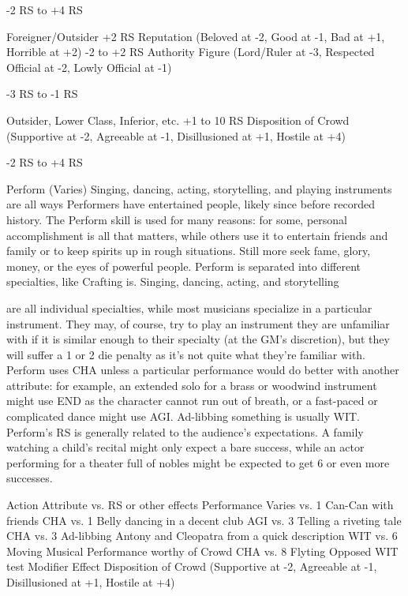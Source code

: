 \documentclass[oneside,11pt,english]{book}
\begin{document}
-2 RS to +4 RS 

Foreigner/Outsider +2 RS 
Reputation (Beloved at -2, Good at -1, Bad at +1, Horrible at +2) -2 to +2 RS 
Authority Figure (Lord/Ruler at -3, Respected Official at -2, Lowly 
Official at -1) 

-3 RS to -1 RS 

Outsider, Lower Class, Inferior, etc. +1 to 10 RS 
Disposition of Crowd (Supportive at -2, Agreeable at -1, Disillusioned at 
+1, Hostile at +4) 

-2 RS to +4 RS 

 

 

Perform (Varies) 
Singing, dancing, acting, storytelling, and playing instruments are all ways Performers have entertained 
people, likely since before recorded history. The Perform skill is used for many reasons: for some, 
personal accomplishment is all that matters, while others use it to entertain friends and family or to keep 
spirits up in rough situations. Still more seek fame, glory, money, or the eyes of powerful people. 
Perform is separated into different specialties, like Crafting is. Singing, dancing, acting, and storytelling 


are all individual specialties, while most musicians specialize in a particular instrument. They may, of 
course, try to play an instrument they are unfamiliar with if it is similar enough to their specialty (at the 
GM’s discretion), but they will suffer a 1 or 2 die penalty as it’s not quite what they’re familiar with. 
Perform uses CHA unless a particular performance would do better with another attribute: for example, 
an extended solo for a brass or woodwind instrument might use END as the character cannot run out of 
breath, or a fast-paced or complicated dance might use AGI. Ad-libbing something is usually WIT. 
Perform’s RS is generally related to the audience’s expectations. A family watching a child’s recital 
might only expect a bare success, while an actor performing for a theater full of nobles might be expected 
to get 6 or even more successes. 

 

Action Attribute vs. RS or other 
effects 
Performance Varies vs. 1 
Can-Can with friends CHA vs. 1 
Belly dancing in a decent club AGI vs. 3 
Telling a riveting tale CHA vs. 3 
Ad-libbing Antony and Cleopatra from a quick description WIT vs. 6 
Moving Musical Performance worthy of Crowd CHA vs. 8 
Flyting Opposed WIT test 
Modifier Effect 
Disposition of Crowd (Supportive at -2, Agreeable at -1, Disillusioned at 
+1, Hostile at +4) 
\end{document}
